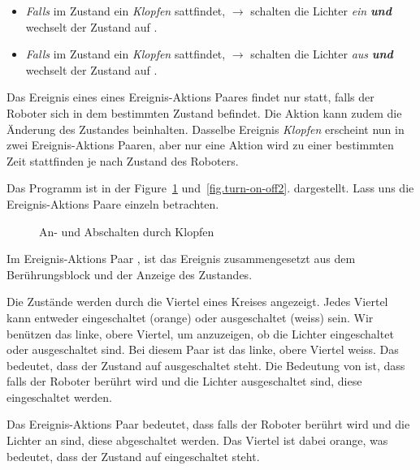 \begin{itemize}

\item \emph{Falls} im Zustand  ein \emph{Klopfen}
sattfindet, $\rightarrow$ schalten die Lichter  \emph{ein} \textbf{\textit{und}} wechselt
der Zustand auf .

\item \emph{Falls} im Zustand  ein \emph{Klopfen}
sattfindet, $\rightarrow$ schalten die Lichter  \emph{aus} \textbf{\textit{und}} wechselt
der Zustand auf .

\end{itemize} 

Das Ereignis eines eines Ereignis-Aktions Paares findet nur statt, falls der Roboter sich in dem bestimmten Zustand befindet. Die Aktion kann zudem die Änderung des Zustandes beinhalten. Dasselbe Ereignis \emph{Klopfen} erscheint nun in zwei Ereignis-Aktions Paaren, aber nur eine Aktion wird zu einer bestimmten Zeit stattfinden je nach Zustand des Roboters.

Das Programm ist in der Figure~\ref{fig.turn-on-off1} und~\ref{fig.turn-on-off2}. dargestellt. Lass uns die Ereignis-Aktions Paare einzeln betrachten.

\begin{figure}
\begin{center}
\caption{An- und Abschalten durch Klopfen}
\label{fig.turn-on-off1}
\end{center}
\end{figure}

Im Ereignis-Aktions Paar , ist das Ereignis zusammengesetzt aus dem Berührungsblock und der Anzeige des Zustandes.

Die Zustände werden durch die Viertel eines Kreises angezeigt. Jedes Viertel kann entweder eingeschaltet (orange) oder ausgeschaltet (weiss) sein. Wir benützen das linke, obere Viertel, um anzuzeigen, ob die Lichter eingeschaltet oder ausgeschaltet sind. Bei diesem Paar ist das linke, obere Viertel weiss. Das bedeutet, dass der Zustand auf ausgeschaltet steht. Die Bedeutung von  ist, dass falls der Roboter berührt wird und die Lichter ausgeschaltet sind, diese eingeschaltet werden.

Das Ereignis-Aktions Paar  bedeutet, dass falls der Roboter berührt wird und die Lichter an sind, diese abgeschaltet werden. Das Viertel ist dabei orange, was bedeutet, dass der Zustand auf eingeschaltet steht.

